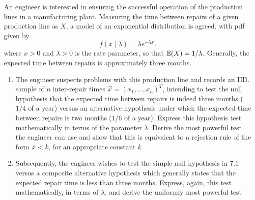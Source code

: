 \documentclass[10pt, a4paper]{article}
\begin{document}
\begin{problem}
    An engineer is interested in ensuring the successful operation of the production lines in a manufacturing plant.
    Measuring the time between repairs of a given production line as $X$,
    a model of an exponential distribution is agreed,
    with pdf given by
    \[
    f(x \mid \lambda) = \lambda e ^ {-\lambda x}.
    \]
    where $x > 0$ and $\lambda > 0$ is the rate parameter,
    so that $\mathbb{E}(X) = 1 / \lambda$.
    Generally,
    the expected time between repairs is approximately three months.
    
    \begin{enumerate}[label = 7.\arabic*]
        \item
        The engineer suspects problems with this production line and records an IID.
        sample of $n$ inter-repair times $\vec{x} = (x_1, \dotsc, x_n) ^ T$,
        intending to test the null hypothesis that the expected time between repairs is indeed three months
        ($1 / 4$ of a year)
        versus an alternative hypothesis under which the expected time between repairs is two months
        ($1 / 6$ of a year).
        Express this hypothesis test mathematically in terms of the parameter $\lambda$.
        Derive the most powerful test the engineer can use and show that this is equivalent to a rejection rule of the form $\bar{x} < k$,
        for an appropriate constant $k$.

        \item
        Subsequently,
        the engineer wishes to test the simple null hypothesis in $7.1$ versus a composite alternative hypothesis which generally states that the expected repair time is less than three months.
        Express,
        again,
        this test mathematically,
        in terms of $\lambda$,
        and derive the uniformly most powerful test
    \end{enumerate}


\end{problem}
\end{document}
